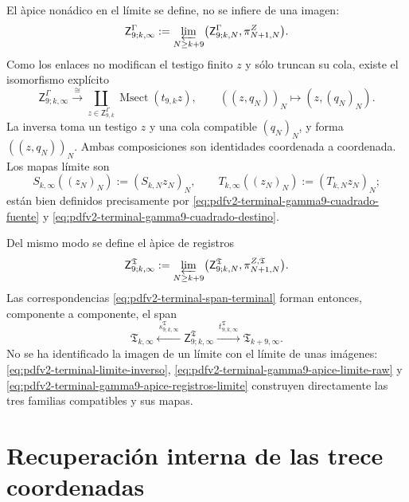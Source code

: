 El \`apice non\'adico en el l\'imite se define, no se infiere de una imagen:
\begin{equation}
\label{eq:pdfv2-terminal-gamma9-apice-limite-raw}
 \mathsf Z^\Gamma_{9;k,\infty}
 :=\varprojlim_{N\geq k+9}
 \bigl(\mathsf Z^\Gamma_{9;k,N},\pi^Z_{N+1,N}\bigr).
\end{equation}
Como los enlaces no modifican el testigo finito \(z\) y s\'olo truncan su
cola, existe el isomorfismo expl\'icito
\begin{equation}
\label{eq:pdfv2-terminal-gamma9-apice-limite-msect}
 \mathsf Z^\Gamma_{9;k,\infty}
 \xrightarrow{\ \cong\ }
 \coprod_{z\in\mathsf Z^\Gamma_{9,k}}
 \operatorname{Msect}(t_{9,k}z),\qquad
 ((z,q_N))_N\longmapsto(z,(q_N)_N).
\end{equation}
La inversa toma un testigo \(z\) y una cola compatible \((q_N)_N\), y forma
\(((z,q_N))_N\). Ambas composiciones son identidades coordenada a
coordenada. Los mapas l\'imite son
\begin{equation}
\label{eq:pdfv2-terminal-gamma9-mapas-limite-raw}
 S_{k,\infty}((z_N)_N):=(S_{k,N}z_N)_N,\qquad
 T_{k,\infty}((z_N)_N):=(T_{k,N}z_N)_N;
\end{equation}
est\'an bien definidos precisamente por
\eqref{eq:pdfv2-terminal-gamma9-cuadrado-fuente} y
\eqref{eq:pdfv2-terminal-gamma9-cuadrado-destino}.

Del mismo modo se define el \`apice de registros
\begin{equation}
\label{eq:pdfv2-terminal-gamma9-apice-registros-limite}
 \mathsf Z^{\mathfrak T}_{9;k,\infty}
 :=\varprojlim_{N\geq k+9}
 \bigl(\mathsf Z^{\mathfrak T}_{9;k,N},
       \pi^{Z,\mathfrak T}_{N+1,N}\bigr).
\end{equation}
Las correspondencias
\eqref{eq:pdfv2-terminal-span-terminal} forman entonces, componente a
componente, el span
\begin{equation}
\label{eq:pdfv2-terminal-span-limite}
 \mathfrak T_{k,\infty}
 \xleftarrow{\ s^{\mathfrak T}_{9;k,\infty}\ }
 \mathsf Z^{\mathfrak T}_{9;k,\infty}
 \xrightarrow{\ t^{\mathfrak T}_{9;k,\infty}\ }
 \mathfrak T_{k+9,\infty}.
\end{equation}
No se ha identificado la imagen de un l\'imite con el l\'imite de unas
im\'agenes: \eqref{eq:pdfv2-terminal-limite-inverso},
\eqref{eq:pdfv2-terminal-gamma9-apice-limite-raw} y
\eqref{eq:pdfv2-terminal-gamma9-apice-registros-limite} construyen
directamente las tres familias compatibles y sus mapas.

\section{Recuperaci\'on interna de las trece coordenadas}


